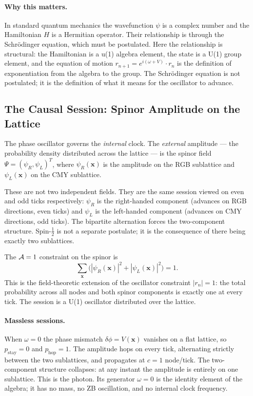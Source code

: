 \paragraph{Why this matters.}
In standard quantum mechanics the wavefunction $\psi$ is a complex
number and the Hamiltonian $H$ is a Hermitian operator.
Their relationship is through the Schr\"odinger equation, which must
be postulated.
Here the relationship is structural: the Hamiltonian is a u(1) algebra
element, the state is a U(1) group element, and the equation of motion
$r_{n+1} = e^{i(\omega+V)} \cdot r_n$ is the definition of
exponentiation from the algebra to the group.
The Schr\"odinger equation is not postulated; it is the definition of
what it means for the oscillator to advance.

\subsection{The Causal Session: Spinor Amplitude on the Lattice}
\label{subsec:causal_session}

The phase oscillator governs the \emph{internal} clock.
The \emph{external} amplitude --- the probability density distributed
across the lattice --- is the spinor field $\Psi = (\psi_R, \psi_L)^T$,
where $\psi_R(\mathbf{x})$ is the amplitude on the RGB sublattice
and $\psi_L(\mathbf{x})$ on the CMY sublattice.

These are not two independent fields.
They are the same session viewed on even and odd ticks respectively:
$\psi_R$ is the right-handed component (advances on RGB directions,
even ticks) and $\psi_L$ is the left-handed component (advances on
CMY directions, odd ticks).
The bipartite alternation forces the two-component structure.
Spin-$\tfrac{1}{2}$ is not a separate postulate; it is the consequence
of there being exactly two sublattices.

The $\mathcal{A}=1$ constraint on the spinor is
\begin{equation}
    \sum_{\mathbf{x}} \bigl(|\psi_R(\mathbf{x})|^2
                           + |\psi_L(\mathbf{x})|^2\bigr) = 1.
    \label{eq:unity_spinor_session}
\end{equation}
This is the field-theoretic extension of the oscillator constraint
$|r_n| = 1$: the total probability across all nodes and both spinor
components is exactly one at every tick.
The session is a U(1) oscillator distributed over the lattice.

\paragraph{Massless sessions.}
When $\omega = 0$ the phase mismatch $\delta\phi = V(\mathbf{x})$
vanishes on a flat lattice, so $p_\mathrm{stay} = 0$ and
$p_\mathrm{hop} = 1$.
The amplitude hops on every tick, alternating strictly between the
two sublattices, and propagates at $c = 1$ node/tick.
The two-component structure collapses: at any instant the amplitude
is entirely on one sublattice.
This is the photon.
Its generator $\omega = 0$ is the identity element of the algebra;
it has no mass, no ZB oscillation, and no internal clock frequency.

